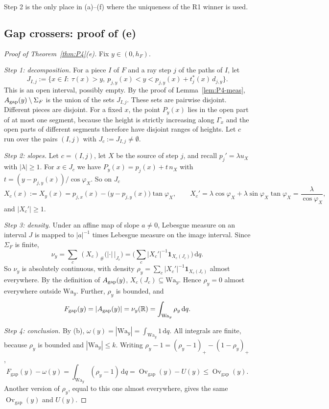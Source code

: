 \documentclass[11pt]{amsart}
\newcommand{\R}{\mathbb R}
\newcommand{\Ovgap}{\operatorname{Ov}_{\mathrm{gap}}}
\newcommand{\Fgap}{F_{\mathrm{gap}}}
\newcommand{\dd}{\,\mathrm d}
\theoremstyle{definition}
\theoremstyle{remark}
\numberwithin{equation}{section}
\begin{document}
Step 2 is the only place in (a)--(f) where the uniqueness of the R1 winner is used.

\subsection{Gap crossers: proof of (e)}\label{ssec:P4-e}

\begin{proof}[Proof of Theorem~\ref{thm:P4}(e)]
Fix $y\in(0,h_F)$.

\emph{Step 1: decomposition.} For a piece $I$ of $F$ and a ray step $j$ of the paths of $I$, let
\[
J_{I,j}:=\{x\in I:\ \tau(x)>y,\ p_{j,y}(x)<y<p_{j,y}(x)+t^*_j(x)\,d_{j,y}\}.
\]
This is an open interval, possibly empty. By the proof of Lemma~\ref{lem:P4-meas}, $A_{\rm gap}(y)\setminus\Sigma_F$ is the union of the sets $J_{I,j}$. These sets are pairwise disjoint. Different pieces are disjoint. For a fixed $x$, the point $P_y(x)$ lies in the open part of at most one segment, because the height is strictly increasing along $\Gamma_x$ and the open parts of different segments therefore have disjoint ranges of heights. Let $c$ run over the pairs $(I,j)$ with $J_c:=J_{I,j}\ne\emptyset$.

\emph{Step 2: slopes.} Let $c=(I,j)$, let $X$ be the source of step $j$, and recall $p_j'=\lambda u_X$ with $|\lambda|\ge1$. For $x\in J_c$ we have $P_y(x)=p_j(x)+t\,n_X$ with $t=(y-p_{j,y}(x))/\cos\varphi_X$. So on $J_c$
\[
X_c(x):=X_y(x)=p_{j,x}(x)-\big(y-p_{j,y}(x)\big)\tan\varphi_X ,\qquad X_c'=\lambda\cos\varphi_X+\lambda\sin\varphi_X\tan\varphi_X=\frac{\lambda}{\cos\varphi_X},
\]
and $|X_c'|\ge1$.

\emph{Step 3: density.} Under an affine map of slope $a\ne0$, Lebesgue measure on an interval $J$ is mapped to $|a|^{-1}$ times Lebesgue measure on the image interval. Since $\Sigma_F$ is finite,
\[
\nu_y=\sum_c\,(X_c)_\#\big(|\cdot|\,\big|_{J_c}\big)=\Big(\sum_c|X_c'|^{-1}\mathbf 1_{X_c(J_c)}\Big)\dd q .
\]
So $\nu_y$ is absolutely continuous, with density $\rho_y=\sum_c|X_c'|^{-1}\mathbf 1_{X_c(J_c)}$ almost everywhere. By the definition of $A_{\rm gap}(y)$, $X_c(J_c)\subseteq\mathrm{Wa}_y$. Hence $\rho_y=0$ almost everywhere outside $\mathrm{Wa}_y$. Further, $\rho_y$ is bounded, and
\[
\Fgap(y)=|A_{\rm gap}(y)|=\nu_y(\R)=\int_{\mathrm{Wa}_y}\rho_y\dd q .
\]

\emph{Step 4: conclusion.} By (b), $\omega(y)=|\mathrm{Wa}_y|=\int_{\mathrm{Wa}_y}1\dd q$. All integrals are finite, because $\rho_y$ is bounded and $|\mathrm{Wa}_y|\le k$. Writing $\rho_y-1=(\rho_y-1)_+-(1-\rho_y)_+$,
\[
\Fgap(y)-\omega(y)=\int_{\mathrm{Wa}_y}(\rho_y-1)\dd q=\Ovgap(y)-U(y)\le\Ovgap(y).
\]
Another version of $\rho_y$, equal to this one almost everywhere, gives the same $\Ovgap(y)$ and $U(y)$.
\end{proof}
\end{document}

